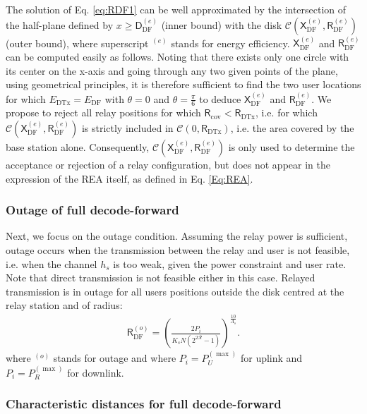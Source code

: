 \documentclass[journal]{IEEEtran}
\theoremstyle{definition}
\begin{document}
The solution of Eq. \eqref{eq:RDF1} can be well approximated by the intersection of the half-plane defined by $x \geq \mathsf{D}_{\text{DF}}^{(e)}$ (inner bound) with the disk $\mathcal{C}\left( \mathsf{X}_{\text{DF}}^{(e)} , \mathsf{R}_{\text{DF}}^{(e)} \right)$ (outer bound), where superscript $^{(e)}$ stands for energy efficiency.
 $\mathsf{X}_{\text{DF}}^{(e)}$ and $\mathsf{R}_{\text{DF}}^{(e)}$ can be computed easily as follows. Noting that there exists only one circle with its center on the x-axis and going through any two given points of the plane, using geometrical principles, it is therefore sufficient to find the two user locations for which $E_{\text{DTx}} = E_{\text{DF}}$ with $\theta = 0$ and $\theta = \frac{\pi}{6}$ to deduce $\mathsf{X}_{\text{DF}}^{(e)}$ and $\mathsf{R}_{\text{DF}}^{(e)}$.
We propose to reject all relay positions for which $\mathsf{R}_{\text{cov}} < \mathsf{R}_{\text{DTx}}$, i.e. for which $\mathcal{C}\left( \mathsf{X}_{\text{DF}}^{(e)} , \mathsf{R}_{\text{DF}}^{(e)} \right)$ is strictly included in $\mathcal{C}\left( 0 , \mathsf{R}_{\text{DTx}}\right)$, i.e. the area covered by the base station alone.
Consequently, $\mathcal{C}\left( \mathsf{X}_{\text{DF}}^{(e)} , \mathsf{R}_{\text{DF}}^{(e)} \right)$ is only used to determine the acceptance or rejection of a relay configuration, but does not appear in the expression of the REA itself, as defined in Eq. \eqref{Eq:REA}.


\subsubsection{Outage of full decode-forward}

Next, we focus on the outage condition. Assuming the relay power is sufficient, outage occurs when the transmission between the relay and user is not feasible, i.e. when the channel $h_s$ is too weak, given the power constraint and user rate. Note that direct transmission is not feasible either in this case. Relayed transmission is in outage for all users positions outside the disk centred at the relay station and of radius:
\begin{align}
\mathsf{R}_{\text{DF}}^{(o)} = \left(\frac{2 P_i}{K_s N \left( 2^{2\mathcal{R}}-1 \right)} \right)^{\frac{10}{A_s}} . \label{Eq:R_DF_o}
\end{align}
where $^{(o)}$ stands for outage and where $P_i=P_U^{(\max)}$ for uplink and $P_i=P_{R}^{(\max)}$ for downlink.


\subsubsection{Characteristic distances for full decode-forward}
\end{document}
